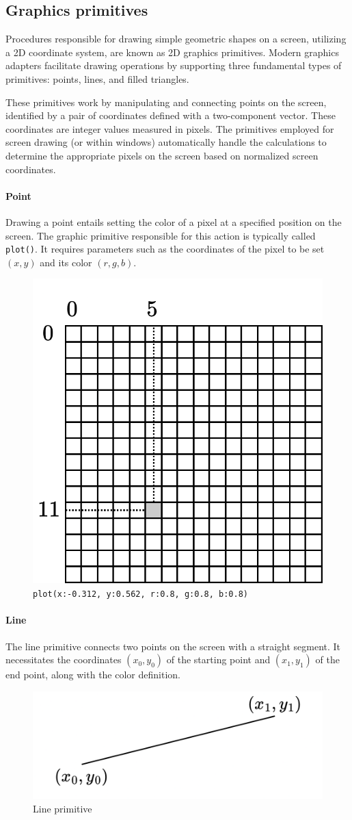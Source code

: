 \subsection{Graphics primitives}
Procedures responsible for drawing simple geometric shapes on a screen, utilizing a 2D coordinate system, are known as 2D graphics primitives.
Modern graphics adapters facilitate drawing operations by supporting three fundamental types of primitives: points, lines, and filled triangles.

These primitives work by manipulating and connecting points on the screen, identified by a pair of coordinates defined with a two-component vector. 
These coordinates are integer values measured in pixels.
The primitives employed for screen drawing (or within windows) automatically handle the calculations to determine the appropriate pixels on the screen based on normalized screen coordinates.

\paragraph*{Point}
Drawing a point entails setting the color of a pixel at a specified position on the screen. 
The graphic primitive responsible for this action is typically called \texttt{plot()}. 
It requires parameters such as the coordinates of the pixel to be set $(x,y)$ and its color $(r,g,b)$.
\begin{figure}[H]
    \centering
    \includegraphics[width=0.35\linewidth]{images/plot.png}
    \caption{\texttt{plot(x:-0.312, y:0.562, r:0.8, g:0.8, b:0.8)}}
\end{figure}

\paragraph*{Line}
The line primitive connects two points on the screen with a straight segment. 
It necessitates the coordinates $(x_0,y_0)$ of the starting point and $(x_1,y_1)$ of the end point, along with the color definition.
\begin{figure}[H]
    \centering
    \includegraphics[width=0.4\linewidth]{images/line.png}
    \caption{Line primitive}
\end{figure}

